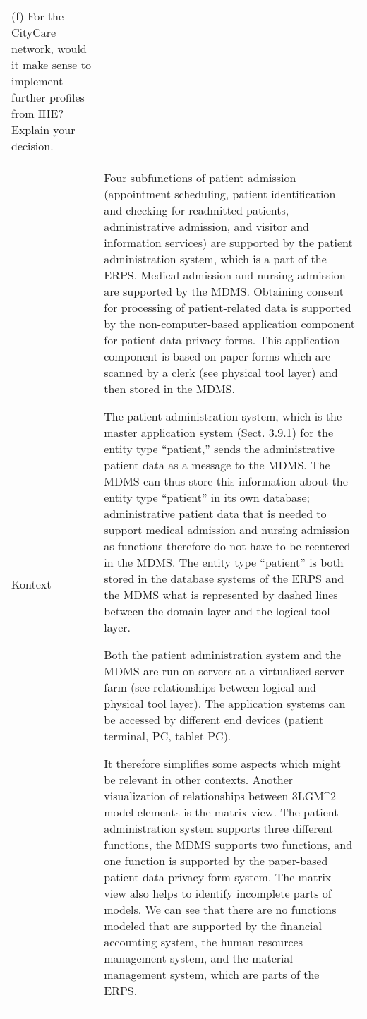 {\begin{landscape}
\begin{longtable}{p{3cm}p{}}
    (f) For the CityCare network, would it make sense to implement further profiles from IHE? Explain your decision.\\
    Kontext & Four subfunctions of patient admission (appointment scheduling, patient identification and checking for readmitted patients, administrative admission, and visitor and information services) are supported by the patient administration system, which is a part of the ERPS.
    Medical admission and nursing admission are supported by the MDMS.
    Obtaining consent for processing of patient-related data is supported by the non-computer-based application component for patient data privacy forms.
    This application component is based on paper forms which are scanned by a clerk (see physical tool layer) and then stored in the MDMS.

    The patient administration system, which is the master application system (Sect. 3.9.1) for the entity type ``patient,'' sends the administrative patient data as a message to the MDMS.
    The MDMS can thus store this information about the entity type ``patient'' in its own database; administrative patient data that is needed to support medical admission and nursing admission as functions therefore do not have to be reentered in the MDMS.
    The entity type ``patient'' is both stored in the database systems of the ERPS and the MDMS what is represented by dashed lines between the domain layer and the logical tool layer.

    Both the patient administration system and the MDMS are run on servers at a virtualized server farm (see relationships between logical and physical tool layer). The application systems can be accessed by different end devices (patient terminal, PC, tablet PC).

    It therefore simplifies some aspects which might be relevant in other contexts.
    Another visualization of relationships between 3LGM\textasciicircum{}2 model elements is the matrix view.
    The patient administration system supports three different functions, the MDMS supports two functions, and one function is supported by the paper-based patient data privacy form system.
    The matrix view also helps to identify incomplete parts of models.
    We can see that there are no functions modeled that are supported by the financial accounting system, the human resources management system, and the material management system, which are parts of the ERPS.


\end{longtable}
\end{landscape}}
